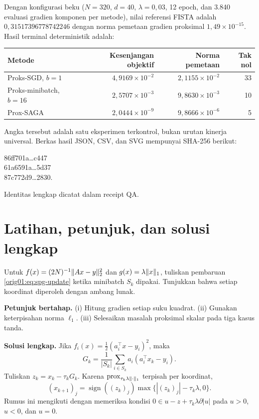 Dengan konfigurasi beku ($N=320$, $d=40$, $\lambda=0{,}03$, 12 epoch, dan
3.840 evaluasi gradien komponen per metode), nilai referensi FISTA adalah
$0{,}31517396778742246$ dengan norma pemetaan gradien proksimal
$1{,}49\times10^{-15}$. Hasil terminal deterministik adalah:
\begin{center}
\begin{tabular}{lrrr}
\hline
Metode & Kesenjangan objektif & Norma pemetaan & Tak nol\\
\hline
Proks-SGD, $b=1$ & $4{,}9169\times10^{-2}$ & $2{,}1155\times10^{-2}$ & 33\\
Proks-minibatch, $b=16$ & $2{,}5707\times10^{-3}$ & $9{,}8630\times10^{-3}$ & 10\\
Prox-SAGA & $2{,}0444\times10^{-9}$ & $9{,}8666\times10^{-6}$ & 5\\
\hline
\end{tabular}
\end{center}
Angka tersebut adalah satu eksperimen terkontrol, bukan urutan kinerja
universal. Berkas hasil JSON, CSV, dan SVG mempunyai SHA-256 berikut:
\begin{center}\small\ttfamily
86ff701a\ldots c447\\
61a6591a\ldots 5d37\\
87c772d9\ldots 2830.
\end{center}
Identitas lengkap dicatat dalam receipt QA.

\section{Latihan, petunjuk, dan solusi lengkap}
\label{orig01:section:exercises}

\begin{exercise}
  \label{orig01:exercise:lasso-prox}
  Untuk $f(x)=(2N)^{-1}\|Ax-y\|_2^2$ dan
  $g(x)=\lambda\|x\|_1$, tuliskan pembaruan
  \eqref{orig01:eq:spg-update} ketika minibatch $S_k$ dipakai. Tunjukkan
  bahwa setiap koordinat diperoleh dengan ambang lunak.

  \textbf{Petunjuk bertahap.}
  (i) Hitung gradien setiap suku kuadrat.
  (ii) Gunakan keterpisahan norma $\ell_1$.
  (iii) Selesaikan masalah proksimal skalar pada tiga kasus tanda.

  \textbf{Solusi lengkap.}
  Jika $f_i(x)=\tfrac12(a_i^\top x-y_i)^2$, maka
  \begin{equation}
    G_k=\frac1{|S_k|}\sum_{i\in S_k}a_i(a_i^\top x_k-y_i).
  \end{equation}
  Tuliskan $z_k=x_k-\tau_kG_k$. Karena
  $\mathrm{prox}_{\tau_k\lambda\|\cdot\|_1}$ terpisah per koordinat,
  \begin{equation}
    (x_{k+1})_j
    =\operatorname{sign}((z_k)_j)
      \max\{|(z_k)_j|-\tau_k\lambda,0\}.
  \end{equation}
  Rumus ini mengikuti dengan memeriksa kondisi
  $0\in u-z+\tau_k\lambda\partial|u|$ pada $u>0$, $u<0$, dan $u=0$.
\end{exercise}


